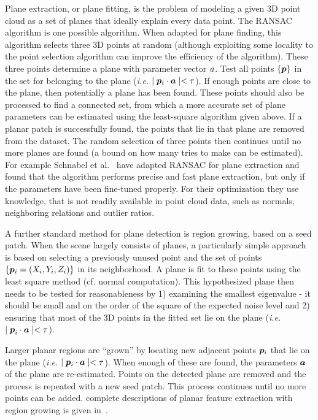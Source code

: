 \documentclass[twocolumn,oneside]{book}
\newcommand{\V}[1]{\vector{#1}}  %
\begin{document}
\begin{itemize}
  Plane extraction, or plane fitting, is the problem of modeling a
  given 3D point cloud as a set of planes that ideally explain every
  data point. The RANSAC algorithm is one possible algorithm. When
  adapted for plane finding, this algorithm selects three 3D points at
  random (although exploiting some locality to the point selection
  algorithm can improve the efficiency of the algorithm). These three
  points determine a plane with parameter vector ${\bf \it a}$.  Test
  all points $\{ \V p \}$ in the set for belonging to the plane
  ({\it i.e.} $\mid \V p_i \cdot \V a \mid < \tau$).  If
  enough points are close to the plane, then potentially a plane has
  been found.  These points should also be processed to find a
  connected set, from which a more accurate set of plane parameters
  can be estimated using the least-square algorithm given above.  If a
  planar patch is successfully found, the points that lie in that
  plane are removed from the dataset.  The random selection of three
  points then continues until no more planes are found (a bound on how
  many tries to make can be estimated). For example Schnabel et
  al.~\cite{Schnabel:2007} have adapted RANSAC for plane extraction
  and found that the algorithm performs precise and fast plane
  extraction, but only if the parameters have been fine-tuned
  properly. For their optimization they use knowledge, that is not
  readily available in point cloud data, such as normals, neighboring
  relations and outlier ratios.

  A further standard method for plane detection is region growing,
  based on a seed patch. When the scene largely consists of planes, a
  particularly simple approach is based on selecting a previously
  unused point and the set of points $\{\V p_i = (X_i,Y_i,Z_i)\}$ in
  its neighborhood. A plane is fit to these points using the least
  square method (cf. normal computation).  This hypothesized plane
  then needs to be tested for reasonableness by 1) examining the
  smallest eigenvalue - it should be small and on the order of the
  square of the expected noise level and 2) ensuring that most of the
  3D points in the fitted set lie on the plane ({\it i.e.} $\mid
  {\V p}_i \cdot \V a \mid < \tau$).

  Larger planar regions are ``grown'' by locating new adjacent points
  $\V p_i$ that lie on the plane ({\it i.e.} $\mid \V p_i \cdot \V a
  \mid < \tau$).  When enough of these are found, the parameters $\V
  a$ of the plane are re-estimated.  Points on the detected plane
  are removed and the process is repeated with a new seed patch.
  This process continues until no more points can be added.
  complete descriptions of planar feature extraction with region
  growing is given in~\cite{hoover}.


\end{itemize}
\end{document}
